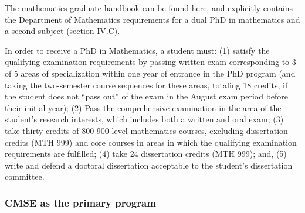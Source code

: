 The mathematics graduate handbook can be
\href{https://math.msu.edu/graduate/files/handbook/Graduate_Student_Handbook.pdf}{found
  here}, and explicitly contains the Department of Mathematics
requirements for a dual PhD in mathematics and a second subject
(section IV.C).

In order to receive a PhD in Mathematics, a student must: (1) satisfy
the qualifying examination requirements by passing written exam
corresponding to 3 of 5 areas of specialization within one year of
entrance in the PhD program (and taking the two-semester course
sequences for these areas, totaling 18 credits, if
the student does not ``pass out'' of the exam in the August exam
period before their initial year);
(2) Pass the comprehensive examination in the area of the
student's research interests, which includes both a written and oral
exam; (3) take thirty credits of 800-900 level mathematics courses,
excluding dissertation credits (MTH 999) and core courses in areas in
which the qualifying examination requirements are fulfilled; (4) take
24 dissertation credits (MTH 999); and, (5) write and defend a
doctoral dissertation acceptable to the student's dissertation
committee.

\subsubsection{CMSE as the primary program}

